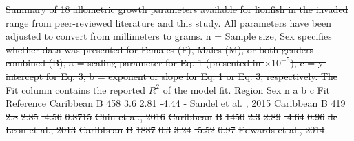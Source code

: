 \documentclass[fleqn,10pt,lineno]{wlpeerj} %
\providecommand{\DIFdel}[1]{{\protect\color{red}\sout{#1}}}                      %
\providecommand{\DIFdelbegin}{} %
\providecommand{\DIFdelFL}[1]{\DIFdel{#1}} %
\begin{document}
\DIFdelbegin %

{%
\DIFdelFL{Summary of 18 allometric growth parameters available for lionfish in the invaded range from peer-reviewed literature and this study. All parameters have been adjusted to convert from millimeters to grams. n = Sample size, Sex specifies whether data was presented for Females (F), Males (M), or both genders combined (B), a = scaling parameter for Eq. 1 (presented in $\times 10^{-5}$), c = y-intercept for Eq. 3, b = exponent or slope for Eq. 1 or Eq. 3, respectively. The Fit column contains the reported $R^2$ of the model fit.}}
\DIFdelFL{Region }%
\DIFdelFL{Sex }%
\DIFdelFL{n }%
\DIFdelFL{a }%
\DIFdelFL{b }%
\DIFdelFL{c }%
\DIFdelFL{Fit }%
\DIFdelFL{Reference}%
\DIFdelFL{Caribbean}%
\DIFdelFL{B }%
\DIFdelFL{458 }%
\DIFdelFL{3.6 }%
\DIFdelFL{2.81 }%
\DIFdelFL{-4.44 }%
\DIFdelFL{- }%
\DIFdelFL{Sandel et al.
, 2015}%
\DIFdelFL{Caribbean }%
\DIFdelFL{B }%
\DIFdelFL{419 }%
\DIFdelFL{2.8 }%
\DIFdelFL{2.85 }%
\DIFdelFL{-4.56 }%
\DIFdelFL{0.8715 }%
\DIFdelFL{Chin et al., 2016}%
\DIFdelFL{Caribbean }%
\DIFdelFL{B }%
\DIFdelFL{1450 }%
\DIFdelFL{2.3 }%
\DIFdelFL{2.89 }%
\DIFdelFL{-4.64 }%
\DIFdelFL{0.96 }%
\DIFdelFL{de Leon et al., 2013}%
\DIFdelFL{Caribbean }%
\DIFdelFL{B }%
\DIFdelFL{1887 }%
\DIFdelFL{0.3 }%
\DIFdelFL{3.24 }%
\DIFdelFL{-5.52 }%
\DIFdelFL{0.97 }%
\DIFdelFL{Edwards et al., 2014}%
\end{document}
